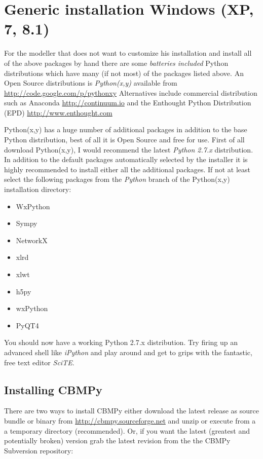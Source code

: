 \documentclass[a4paper,11pt,english]{sphinxmanual}
\begin{document}
\section{Generic installation Windows (XP, 7, 8.1)}
\label{install_doc:generic-installation-windows-xp-7-8-1}
For the modeller that does not want to customize his installation and install
all of the above packages by hand there are some \emph{batteries included} Python
distributions which have many (if not most) of the packages listed above. An
Open Source distributions is \emph{Python(x,y)} available from \href{http://code.google.com/p/pythonxy}{http://code.google.com/p/pythonxy}
Alternatives include commercial distribution such as Anaconda \href{http://continuum.io}{http://continuum.io} and the
Enthought Python Distribution (EPD) \href{http://www.enthought.com}{http://www.enthought.com}

Python(x,y) has a huge number of additional packages in addition to the base
Python distribution, best of all it is Open Source and free for use. First of
all download Python(x,y), I would recommend the
latest \emph{Python 2.7.x} distribution. In addition to the default packages
automatically selected by the installer it is highly recommended to install
either all the additional packages. If not at least select the following
packages from the \emph{Python} branch of the Python(x,y) installation directory:
\begin{itemize}
\item {} 
WxPython

\item {} 
Sympy

\item {} 
NetworkX

\item {} 
xlrd

\item {} 
xlwt

\item {} 
h5py

\item {} 
wxPython

\item {} 
PyQT4

\end{itemize}

You should now have a working Python 2.7.x distribution. Try firing up an
advanced shell like \emph{iPython} and play around and get to grips with the
fantastic, free text editor \emph{SciTE}.


\subsection{Installing CBMPy}
\label{install_doc:installing-cbmpy}
There are two ways to install CBMPy either download the latest release as
source bundle or binary from \href{http://cbmpy.sourceforge.net}{http://cbmpy.sourceforge.net} and unzip or execute from a
a temporary directory (recommended). Or, if you want the latest
(greatest and potentially broken) version grab the latest revision from the
the CBMPy Subversion repository:
\end{document}
